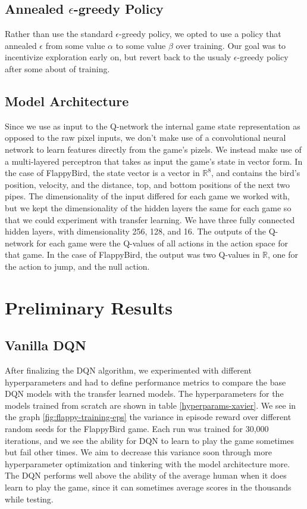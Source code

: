 \documentclass{article}
\begin{document}
\subsection{Annealed $\epsilon$-greedy Policy}
Rather than use the standard $\epsilon$-greedy policy, we opted to use a policy that annealed $\epsilon$ from some value $\alpha$ to some value $\beta$ over training.
Our goal was to incentivize exploration early on, but revert back to the usualy $\epsilon$-greedy policy after some about of training.


\subsection{Model Architecture}
Since we use as input to the Q-network the internal game state representation as opposed to the raw pixel inputs, we don't make use of a convolutional neural network to learn features directly from the game's pizels.
We instead make use of a multi-layered perceptron that takes as input the game's state in vector form.
In the case of FlappyBird, the state vector is a vector in $\mathbb{R}^8$, and contains the bird's position, velocity, and the distance, top, and bottom positions of the next two pipes.
The dimensionality of the input differed for each game we worked with, but we kept the dimensionality of the hidden layers the same for each game so that we could experiment with transfer learning.
We have three fully connected hidden layers, with dimensionality 256, 128, and 16.
The outputs of the Q-network for each game were the Q-values of all actions in the action space for that game.
In the case of FlappyBird, the output was two Q-values in $\mathbb{R}$, one for the action to jump, and the null action.

\section{Preliminary Results}

\subsection{Vanilla DQN}
After finalizing the DQN algorithm, we experimented with different hyperparameters and had to define performance metrics to compare the base DQN models with the transfer learned models. 
The hyperparameters for the models trained from scratch are shown in table \ref{hyperparams-xavier}.
We see in the graph \ref{fig:flappy-training-eps} the variance in episode reward over different random seeds for the FlappyBird game.
Each run was trained for 30,000 iterations, and we see the ability for DQN to learn to play the game sometimes but fail other times.
We aim to decrease this variance soon through more hyperparameter optimization and tinkering with the model architecture more.
The DQN performs well above the ability of the average human when it does learn to play the game, since it can sometimes average scores in the thousands while testing.
\end{document}
